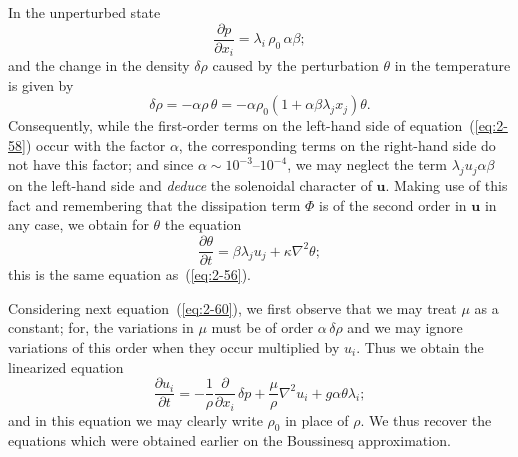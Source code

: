 In the unperturbed state
\begin{equation}
\label{eq:2-61}
\frac{\partial p}{\partial x_i} = \lambda_i\,\rho_0\,\alpha\beta;
\end{equation}
and the change in the density $\delta\rho$ caused by the perturbation $\theta$ in the
temperature is given by
\begin{equation}
\label{eq:2-62}
\delta\rho = -\alpha\rho\,\theta = -\alpha\rho_0(1 + \alpha\beta\lambda_j x_j)\theta.
\end{equation}
Consequently, while the first-order terms on the left-hand side of
equation~(\ref{eq:2-58}) occur with the factor $\alpha$, the corresponding terms on the
right-hand side do not have this factor; and since $\alpha \sim 10^{-3}$--$10^{-4}$, we
may neglect the term $\lambda_j u_j\alpha\beta$ on the left-hand side and \emph{deduce} the
solenoidal character of $\mathbf{u}$. Making use of this fact and remembering
that the dissipation term $\Phi$ is of the second order in $\mathbf{u}$ in any case, we
obtain for $\theta$ the equation
\begin{equation}
\label{eq:2-63}
\frac{\partial\theta}{\partial t} = \beta\lambda_j u_j + \kappa\nabla^2\theta;
\end{equation}
this is the same equation as~(\ref{eq:2-56}).

Considering next equation~(\ref{eq:2-60}), we first observe that we may treat $\mu$
as a constant; for, the variations in $\mu$ must be of order $\alpha\,\delta\rho$ and we may
ignore variations of this order when they occur multiplied by $u_i$. Thus
we obtain the linearized equation
\begin{equation}
\label{eq:2-64}
\frac{\partial u_i}{\partial t} = -\frac{1}{\rho}\frac{\partial}{\partial x_i}\,\delta p + \frac{\mu}{\rho}\nabla^2 u_i + g\alpha\theta\lambda_i;
\end{equation}
and in this equation we may clearly write $\rho_0$ in place of $\rho$. We thus
recover the equations which were obtained earlier on the Boussinesq
approximation.

